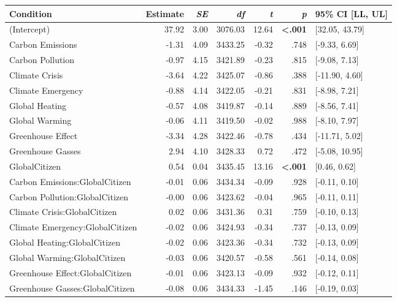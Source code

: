 \begin{table}[ht]
\centering
\begin{tabular}{lrrrrrl}
  \hline
Condition & Estimate & \textit{SE} & \textit{df} & \textit{t} & \textit{p} & 95\% CI [LL, UL] \\ 
  \hline
(Intercept) & 37.92 & 3.00 & 3076.03 & 12.64 & \textbf{\textless  .001} & [32.05, 43.79] \\ 
  Carbon Emissions & -1.31 & 4.09 & 3433.25 & -0.32 & .748 & [-9.33, 6.69] \\ 
  Carbon Pollution & -0.97 & 4.15 & 3421.89 & -0.23 & .815 & [-9.08, 7.13] \\ 
  Climate Crisis & -3.64 & 4.22 & 3425.07 & -0.86 & .388 & [-11.90, 4.60] \\ 
  Climate Emergency & -0.88 & 4.14 & 3422.05 & -0.21 & .831 & [-8.98, 7.21] \\ 
  Global Heating & -0.57 & 4.08 & 3419.87 & -0.14 & .889 & [-8.56, 7.41] \\ 
  Global Warming & -0.06 & 4.11 & 3419.50 & -0.02 & .988 & [-8.10, 7.97] \\ 
  Greenhouse Effect & -3.34 & 4.28 & 3422.46 & -0.78 & .434 & [-11.71, 5.02] \\ 
  Greenhouse Gasses & 2.94 & 4.10 & 3428.33 & 0.72 & .472 & [-5.08, 10.95] \\ 
  GlobalCitizen & 0.54 & 0.04 & 3435.45 & 13.16 & \textbf{\textless  .001} & [0.46, 0.62] \\ 
  Carbon Emissions:GlobalCitizen & -0.01 & 0.06 & 3434.34 & -0.09 & .928 & [-0.11, 0.10] \\ 
  Carbon Pollution:GlobalCitizen & -0.00 & 0.06 & 3423.62 & -0.04 & .965 & [-0.11, 0.11] \\ 
  Climate Crisis:GlobalCitizen & 0.02 & 0.06 & 3431.36 & 0.31 & .759 & [-0.10, 0.13] \\ 
  Climate Emergency:GlobalCitizen & -0.02 & 0.06 & 3424.93 & -0.34 & .737 & [-0.13, 0.09] \\ 
  Global Heating:GlobalCitizen & -0.02 & 0.06 & 3423.36 & -0.34 & .732 & [-0.13, 0.09] \\ 
  Global Warming:GlobalCitizen & -0.03 & 0.06 & 3420.57 & -0.58 & .561 & [-0.14, 0.08] \\ 
  Greenhouse Effect:GlobalCitizen & -0.01 & 0.06 & 3423.13 & -0.09 & .932 & [-0.12, 0.11] \\ 
  Greenhouse Gasses:GlobalCitizen & -0.08 & 0.06 & 3434.33 & -1.45 & .146 & [-0.19, 0.03] \\ 
   \hline
\end{tabular}
\end{table}
